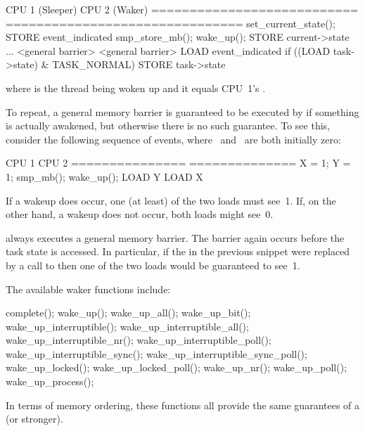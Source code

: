 \begin{VerbatimU}
	CPU 1 (Sleeper)             CPU 2 (Waker)
	=========================== ===============================
	set_current_state();        STORE event_indicated
	  smp_store_mb();           wake_up();
	    STORE current->state      ...
	    <general barrier>         <general barrier>
	LOAD event_indicated          if ((LOAD task->state) & TASK_NORMAL)
	                                STORE task->state
\end{VerbatimU}

\noindent%
where  is the thread being woken up and it equals CPU~1's .

To repeat, a general memory barrier is guaranteed to be executed by
 if something is actually awakened, but otherwise there is
no such guarantee.
To see this, consider the following sequence of events, where~ and~ are both
initially zero:

\begin{VerbatimU}
	CPU 1           CPU 2
	=============== ==============
	X = 1;          Y = 1;
	smp_mb();       wake_up();
	LOAD Y          LOAD X
\end{VerbatimU}

If a wakeup does occur, one (at least) of the two loads must see~1.
If, on the other hand, a wakeup does not occur, both loads might see~0.

 always executes a general memory barrier.
The barrier again occurs before the task state is accessed.
In particular, if the  in the previous snippet were replaced
by a call to  then one of the two loads would be
guaranteed to see~1.

The available waker functions include:

\begin{VerbatimU}
	complete();
	wake_up();
	wake_up_all();
	wake_up_bit();
	wake_up_interruptible();
	wake_up_interruptible_all();
	wake_up_interruptible_nr();
	wake_up_interruptible_poll();
	wake_up_interruptible_sync();
	wake_up_interruptible_sync_poll();
	wake_up_locked();
	wake_up_locked_poll();
	wake_up_nr();
	wake_up_poll();
	wake_up_process();
\end{VerbatimU}

In terms of memory ordering, these functions all provide the same guarantees of
a  (or stronger).

